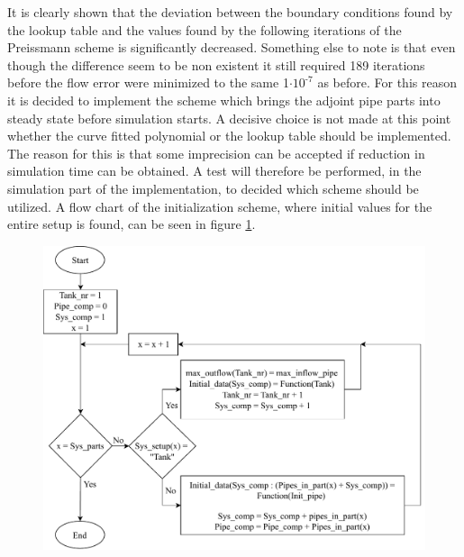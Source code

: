 {It is clearly shown that the deviation between the boundary conditions found by the lookup table and the values found by the following iterations of the Preissmann scheme is significantly decreased.
Something else to note is that even though the difference seem to be non existent it still required 189 iterations before the flow error were minimized to the same 1$\cdot \text{10}^{\text{-7}}$ as before. For this reason it is decided to implement the scheme which brings the adjoint pipe parts into steady state before simulation starts. A decisive choice is not made at this point whether the curve fitted polynomial or the lookup table should be implemented. The reason for this is that some imprecision can be accepted if reduction in simulation time can be obtained. A test will therefore be performed, in the simulation part of the implementation, to decided which scheme should be utilized. A flow chart of the initialization scheme, where initial values for the entire setup is found, can be seen in figure \ref{fig:init_sys_dia}.

\begin{figure}[H]
\centering
\includegraphics[width=1.05 \textwidth]{report/simulation/pictures/init_sys_dia.pdf}
\caption{}
\label{fig:init_sys_dia}
\end{figure}

}
